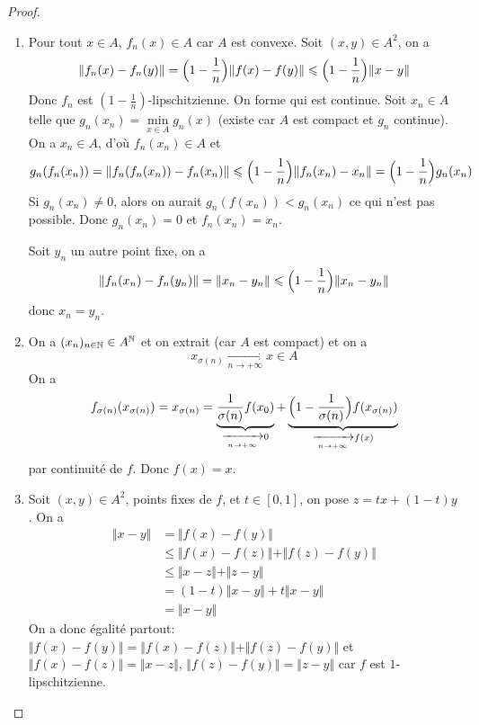\begin{proof}
	\phantom{}
	\begin{enumerate}
		\item Pour tout $x\in A$, $f_{n}(x)\in A$ car $A$ est convexe. Soit $(x,y)\in A^{2}$, on a
		\begin{equation}\Vert f_{n}(x)-f_{n}(y)\Vert=\Bigl(1-\frac{1}{n}\Bigr)\Vert f(x)-f(y)\Vert\leqslant\Bigl(1-\frac{1}{n}\Bigr)\Vert x-y\Vert\end{equation}
		Donc $f_{n}$ est $(1-\frac{1}{n})$-lipschitzienne. On forme 
		qui est continue. Soit $x_{n}\in A$ telle que $g_{n}(x_{n})=\min\limits_{x\in A}g_{n}(x)$ (existe car $A$ est compact et $g_{n}$ continue). On a $x_{n}\in A$, d'où $f_{n}(x_{n})\in A$ et 
		\begin{equation}g_{n}(f_{n}(x_{n}))=\Vert f_{n}(f_{n}(x_{n}))-f_{n}(x_{n})\Vert\leqslant\Bigl(1-\frac{1}{n}\Bigr)\Vert f_{n}(x_{n})-x_{n}\Vert=\Bigl(1-\frac{1}{n}\Bigr)g_{n}(x_{n})\end{equation}
		Si $g_{n}(x_{n})\neq0$, alors on aurait $g_{n}(f(x_{n}))<g_{n}(x_{n})$ ce qui n'est pas possible. Donc $g_{n}(x_{n})=0$ et $f_{n}(x_{n})=x_{n}$.

		Soit $y_{n}$ un autre point fixe, on a 
		\begin{equation}\Vert f_{n}(x_{n})-f_{n}(y_{n})\Vert=\Vert x_{n}-y_{n}\Vert\leqslant\Bigl(1-\frac{1}{n}\Bigr)\Vert x_{n}-y_{n}\Vert\end{equation}
		donc $x_{n}=y_{n}$.

		\item On a $(x_{n})_{n\in\mathbb{N}}\in A^{\mathbb{N}}$ et on extrait (car $A$ est compact) et on a 
		\begin{equation}x_{\sigma(n)}\xrightarrow[n\to+\infty]{}x\in A\end{equation}
		On a 
		\begin{equation}f_{\sigma(n)}(x_{\sigma(n)})=x_{\sigma(n)}=\underbrace{\frac{1}{\sigma(n)}f(x_{0})}_{\xrightarrow[n\to+\infty]{}0}+\underbrace{\Bigl(1-\frac{1}{\sigma(n)}\Bigr)f(x_{\sigma(n)})}_{\xrightarrow[n\to+\infty]{}f(x)}\end{equation}
		par continuité de $f$. Donc $f(x)=x$.

		\item Soit $(x,y)\in A^{2}$, points fixes de $f$, et $t\in[0,1]$, on pose $z=tx+(1-t)y$. On a 
		\begin{align}
			\Vert x-y\Vert
			&=\Vert f(x)-f(y)\Vert\\
			&\leqslant \Vert f(x)-f(z)\Vert+\Vert f(z)-f(y)\Vert\\
			&\leqslant\Vert x-z\Vert+\Vert z-y\Vert\\
			&=(1-t)\Vert x-y\Vert+t\Vert x-y\Vert\\
			&=\Vert x-y\Vert
		\end{align}
		On a donc égalité partout: $\Vert f(x)-f(y)\Vert=\Vert f(x)-f(z)\Vert+\Vert f(z)-f(y)\Vert$ et $\Vert f(x)-f(z)\Vert=\Vert x-z\Vert$, $\Vert f(z)-f(y)\Vert=\Vert z-y\Vert$ car $f$ est $1$-lipschitzienne.


\end{enumerate}
\end{proof}
